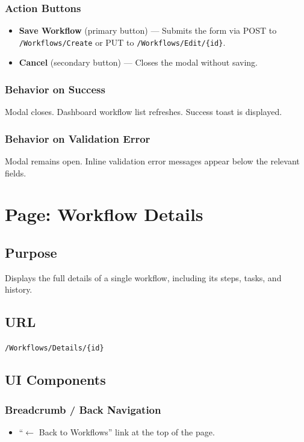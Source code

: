 \documentclass[12pt]{article}
\begin{document}
\subsubsection{Action Buttons}
\begin{itemize}
    \item \textbf{Save Workflow} (primary button) --- Submits the form via POST to
    \texttt{/Workflows/Create} or PUT to \texttt{/Workflows/Edit/\{id\}}.
    \item \textbf{Cancel} (secondary button) --- Closes the modal without saving.
\end{itemize}

\subsubsection{Behavior on Success}
Modal closes. Dashboard workflow list refreshes. Success toast is displayed.

\subsubsection{Behavior on Validation Error}
Modal remains open. Inline validation error messages appear below the relevant fields.

\section{Page: Workflow Details}

\subsection{Purpose}
Displays the full details of a single workflow, including its steps, tasks, and history.

\subsection{URL}
\texttt{/Workflows/Details/\{id\}}

\subsection{UI Components}

\subsubsection{Breadcrumb / Back Navigation}
\begin{itemize}
    \item ``$\leftarrow$ Back to Workflows'' link at the top of the page.
\end{itemize}
\end{document}

